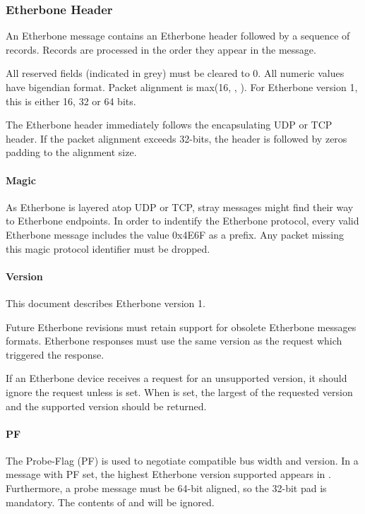 \documentclass{article}
\begin{document}
\subsubsection{Etherbone Header}

An Etherbone message contains an Etherbone header followed by a 
sequence of records.
Records are processed in the order they appear in the message.

All reserved fields (indicated in grey) must be cleared to 0.
All numeric values have bigendian format.
Packet alignment is max(16, , ).
For Etherbone version 1, this is either 16, 32 or 64 bits.

The Etherbone header immediately follows the encapsulating UDP or TCP header.
If the packet alignment exceeds 32-bits, 
the header is followed by zeros padding to the alignment size.

\paragraph{Magic} \label{field:Magic}

As Etherbone is layered atop UDP or TCP, 
stray messages might find their way to Etherbone endpoints.
In order to indentify the Etherbone protocol,
every valid Etherbone message includes the value 0x4E6F as a prefix.
Any packet missing this magic protocol identifier must be dropped.

\paragraph{Version} \label{field:Version}

This document describes Etherbone version 1.

Future Etherbone revisions must retain support for obsolete
Etherbone messages formats.
Etherbone responses must use the same version as the request
which triggered the response.

If an Etherbone device receives a request for an unsupported version,
it should ignore the request unless  is set.
When  is set, the largest of the requested version
and the supported version should be returned.

\paragraph{PF} \label{field:PF}

The Probe-Flag (PF) is used to negotiate compatible bus width and version.
In a message with PF set,
the highest Etherbone version supported appears in .
Furthermore, a probe message must be 64-bit aligned, so the 32-bit pad is mandatory.
The contents of  and  will be ignored.
\end{document}
